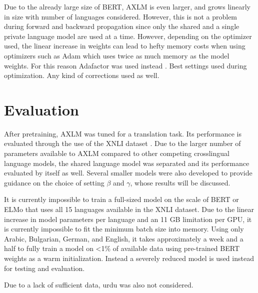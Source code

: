 \documentclass[12pt,letterpaper,twocolumn]{article}
\begin{document}
Due to the already large size of BERT, AXLM is even larger, and grows linearly in size with number of languages considered.  However, this is not a problem during forward and backward propagation since only the shared and a single private language model are used at a time.  However, depending on the optimizer used, the linear increase in weights can lead to hefty memory costs when using optimizers such as Adam which uses twice as much memory as the model weights.  For this reason Adafactor was used instead \cite{}.  Best settings used during optimization.  Any kind of corrections used as well.

\section{Evaluation}

After pretraining, AXLM was tuned for a translation task.  Its performance is evaluated through the use of the XNLI dataset \cite{}.  Due to the larger number of parameters available to AXLM compared to other competing crosslingual language models, the shared language model was separated and its performance evaluated by itself as well.  Several smaller models were also developed to provide guidance on the choice of setting $\beta$ and $\gamma$, whose results will be discussed.

It is currently impossible to train a full-sized model on the scale of BERT or ELMo that uses all 15 languages available in the XNLI dataset.  Due to the linear increase in model parameters per language and an 11 GB limitation per GPU, it is currently impossible to fit the minimum batch size into memory.  Using only Arabic, Bulgarian, German, and English, it takes approximately a week and a half to fully train a model on <1\% of available data using pre-trained BERT weights as a warm initialization.  Instead a severely reduced model is used instead for testing and evaluation.

Due to a lack of sufficient data, urdu was also not considered.
\end{document}
